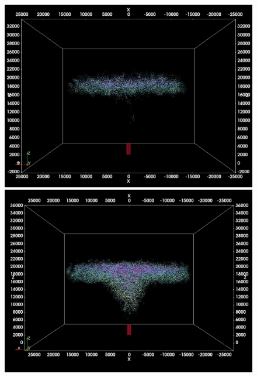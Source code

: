 \begin{figure}
\begin{minipage}{.33\textwidth}
        \includegraphics[width=0.99 \textwidth]{Chapter-6/Figures/ShortErupt/Erupt100_t350}
    \end{minipage}%
    \begin{minipage}{.33 \textwidth}
        \centering
        \includegraphics[width=0.99 \textwidth]{Chapter-6/Figures/ShortErupt/Erupt300_t350}
    \end{minipage}%
    \\
    \begin{minipage}{.33\textwidth}
        \centering

\end{minipage}
\end{figure}
